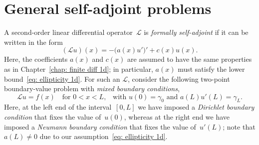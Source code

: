 \section{General self-adjoint problems}\label{sec: self-adjoint 1d}
A second-order linear differential operator~$\mathcal{L}$ is 
\emph{formally self-adjoint} if it can be written in the form
\begin{equation}\label{eq: L self-adjoint}
(\mathcal{L}u)(x)=-\bigl(a(x)u'\bigr)'+c(x)u(x).
\end{equation}
Here, the coefficients $a(x)$ and $c(x)$ are assumed to have the same 
properties as in Chapter~\ref{chap: finite diff 1d}; in particular, $a(x)$ must 
satisfy the lower bound~\eqref{eq: ellipticity 1d}. For such an $\mathcal{L}$, 
consider the following two-point boundary-value problem with \emph{mixed 
boundary conditions},
\begin{equation}\label{eq: self-adjoint mixed}
\mathcal{L}u=f(x)\quad\text{for $0<x<L$,}\quad
\text{with $u(0)=\gamma_0$ and $a(L)u'(L)=\gamma_L$.}
\end{equation}
Here, at the left end of the interval~$[0,L]$ we have imposed a
\emph{Dirichlet boundary condition} that fixes the value of~$u(0)$, whereas
at the right end we have imposed a \emph{Neumann boundary condition} that
fixes the value of~$u'(L)$; note that $a(L)\ne0$ due to our 
assumption~\eqref{eq: ellipticity 1d}.

